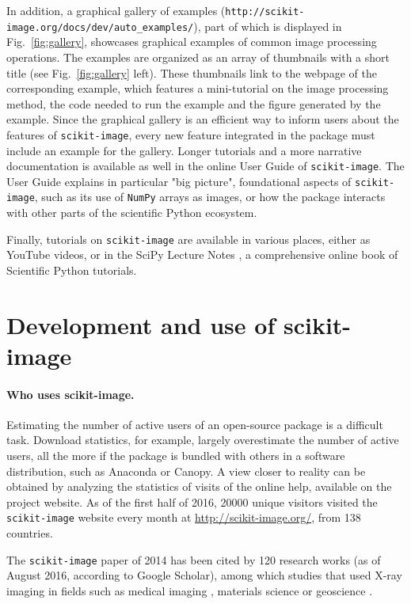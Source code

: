 \documentclass[twocolumn]{bmcart}%
\begin{document}
In addition, a graphical gallery of examples
(\nolinkurl{http://scikit-image.org/docs/dev/auto_examples/}), part of
which is displayed in Fig.~\ref{fig:gallery}, showcases graphical
examples of common image processing operations.  The examples are
organized as an array of thumbnails with a short title (see
Fig.~\ref{fig:gallery} left). These thumbnails link to the webpage of the
corresponding example, which features a mini-tutorial on the image
processing method, the code needed to run the example and the figure
generated by the example. Since the graphical gallery is an efficient way
to inform users about the features of \texttt{scikit-image}, every new
feature integrated in the package must include an example for the
gallery. Longer tutorials and a more narrative documentation is available
as well in the online User Guide of \texttt{scikit-image}. The User Guide
explains in particular "big picture", foundational aspects of
\texttt{scikit-image}, such as its use of \texttt{NumPy} arrays as
images, or how the package interacts with other parts of the scientific
Python ecosystem.

Finally, tutorials on \texttt{scikit-image} are available in various
places, either as YouTube videos, or in the SciPy Lecture
Notes \citep{scipylecturenotes}, a comprehensive online book of Scientific
Python tutorials.  

\section*{Development and use of scikit-image}

\paragraph{Who uses scikit-image.}

Estimating the number of active users of an open-source package is a
difficult task. Download statistics, for example, largely
overestimate the number of active users, all the more if the package is
bundled with others in a software distribution, such as Anaconda or
Canopy. A view closer to reality can be obtained by analyzing the
statistics of visits of the online help, available on the project
website.  As of the first half of 2016, 20000 unique visitors visited the
\texttt{scikit-image} website every month at
\url{http://scikit-image.org/}, from 138 countries.

The \texttt{scikit-image} paper of 2014 \citep{Vanderwalt2014} has been
cited by 120 research works (as of August 2016, according to Google
Scholar), among which studies that used X-ray imaging in fields such as
medical imaging \citep{Shen2015, Malan2016, Blackledge2016}, materials
science \citep{Bouttes2015} or geoscience \citep{Schluter2014}.
\end{document}
